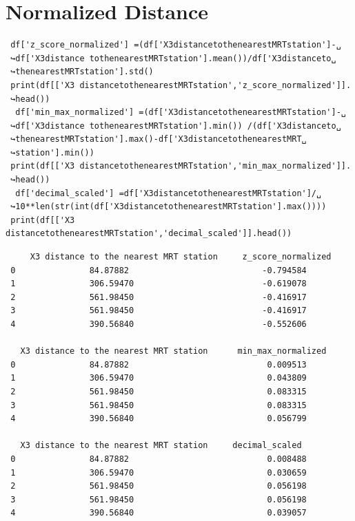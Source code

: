 \section{Normalized Distance}
\begin{lstlisting}
 df['z_score_normalized'] =(df['X3distancetothenearestMRTstation']-␣
 ↪df['X3distance tothenearestMRTstation'].mean())/df['X3distanceto␣
 ↪thenearestMRTstation'].std()
 print(df[['X3 distancetothenearestMRTstation','z_score_normalized']].
 ↪head())
  df['min_max_normalized'] =(df['X3distancetothenearestMRTstation']-␣
 ↪df['X3distance tothenearestMRTstation'].min()) /(df['X3distanceto␣
 ↪thenearestMRTstation'].max()-df['X3distancetothenearestMRT␣
 ↪station'].min())
 print(df[['X3 distancetothenearestMRTstation','min_max_normalized']].
 ↪head())
  df['decimal_scaled'] =df['X3distancetothenearestMRTstation']/␣
 ↪10**len(str(int(df['X3distancetothenearestMRTstation'].max())))
 print(df[['X3 distancetothenearestMRTstation','decimal_scaled']].head())
\end{lstlisting}
\begin{verbatim}
     X3 distance to the nearest MRT station     z_score_normalized
 0               84.87882                           -0.794584
 1               306.59470                          -0.619078
 2               561.98450                          -0.416917
 3               561.98450                          -0.416917
 4               390.56840                          -0.552606  

   X3 distance to the nearest MRT station      min_max_normalized
 0               84.87882                            0.009513
 1               306.59470                           0.043809
 2               561.98450                           0.083315
 3               561.98450                           0.083315
 4               390.56840                           0.056799 

   X3 distance to the nearest MRT station     decimal_scaled
 0               84.87882                            0.008488
 1               306.59470                           0.030659
 2               561.98450                           0.056198
 3               561.98450                           0.056198
 4               390.56840                           0.039057  
\end{verbatim}
